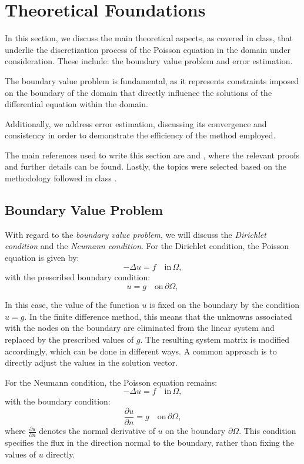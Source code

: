 \documentclass[aps,amsmath,amssymb,floatfix]{revtex4}
\begin{document}
    
\section{Theoretical Foundations}
In this section, we discuss the main theoretical aspects, as covered in class, that underlie the discretization process of the Poisson equation in the domain under consideration. These include: the boundary value problem and error estimation.

The boundary value problem is fundamental, as it represents constraints imposed on the boundary of the domain that directly influence the solutions of the differential equation within the domain.

Additionally, we address error estimation, discussing its convergence and consistency in order to demonstrate the efficiency of the method employed.

The main references used to write this section are \cite{Chen2014} and \cite{Butler2021}, where the relevant proofs and further details can be found. Lastly, the topics were selected based on the methodology followed in class \cite{Kuhl2024}.

    
\subsection{Boundary Value Problem}

With regard to the \textit{boundary value problem}, we will discuss the \textit{Dirichlet condition} and the \textit{Neumann condition}. For the Dirichlet condition, the Poisson equation is given by:
\begin{equation*}
	-\Delta u = f \quad \text{in} \, \Omega,
\end{equation*}
with the prescribed boundary condition:
\begin{equation*}
	u = g \quad \text{on} \, \partial \Omega,
\end{equation*}

In this case, the value of the function $u$ is fixed on the boundary by the condition $u = g$. In the finite difference method, this means that the unknowns associated with the nodes on the boundary are eliminated from the linear system and replaced by the prescribed values of $g$. The resulting system matrix is modified accordingly, which can be done in different ways. A common approach is to directly adjust the values in the solution vector.

For the Neumann condition, the Poisson equation remains:
\begin{equation*}
	-\Delta u = f \quad \text{in} \, \Omega,
\end{equation*}
with the boundary condition:
\begin{equation*}
	\frac{\partial u}{\partial n} = g \quad \text{on} \, \partial \Omega,
\end{equation*}
where $\frac{\partial u}{\partial n}$ denotes the normal derivative of $u$ on the boundary $\partial \Omega$. This condition specifies the flux in the direction normal to the boundary, rather than fixing the values of $u$ directly.
\end{document}
